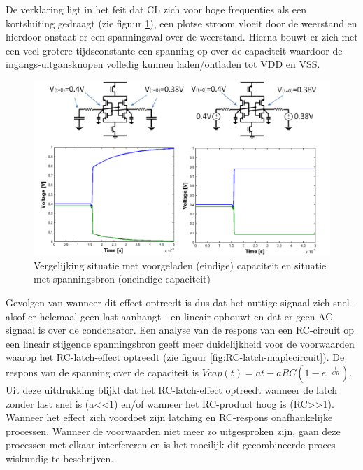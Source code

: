 De verklaring ligt in het feit dat CL zich voor hoge frequenties als een kortsluiting gedraagt (zie figuur \ref{fig:RC-latch-explain}), een plotse stroom vloeit door de weerstand en hierdoor onstaat er een spanningsval over de weerstand. Hierna bouwt er zich met een veel grotere tijdsconstante een spanning op over de capaciteit waardoor de ingangs-uitgansknopen volledig kunnen laden/ontladen tot VDD en VSS.
\begin{figure}
  \centering
  \includegraphics[width=\textwidth]{../fig/hfdstk-sensamp-RC-latch-explain.png}
  \caption[Invloed capaciteit op RC-latch effect]{Vergelijking situatie met voorgeladen (eindige) capaciteit en situatie met spanningsbron (oneindige capaciteit)}
  \label{fig:RC-latch-explain}
\end{figure}
Gevolgen van wanneer dit effect optreedt is dus dat het nuttige signaal zich snel - alsof er helemaal geen last aanhangt - en lineair opbouwt en dat er geen AC-signaal is over de condensator. Een analyse van de respons van een RC-circuit op een lineair stijgende spanningsbron geeft meer duidelijkheid voor de voorwaarden waarop het RC-latch-effect optreedt (zie figuur \ref{fig:RC-latch-maplecircuit}). De respons van de spanning over de capaciteit is $Vcap(t) =  at - aRC(1-e^{-{\frac {t}{CR}}})$. Uit deze uitdrukking blijkt dat het RC-latch-effect optreedt wanneer de latch zonder last snel is (a<<1) en/of wanneer het RC-product hoog is (RC>>1).
Wanneer het effect zich voordoet zijn latching en RC-respons onafhankelijke processen. Wanneer de voorwaarden niet meer zo uitgesproken zijn, gaan deze processen met elkaar interfereren en is het moeilijk dit gecombineerde proces wiskundig te beschrijven.
